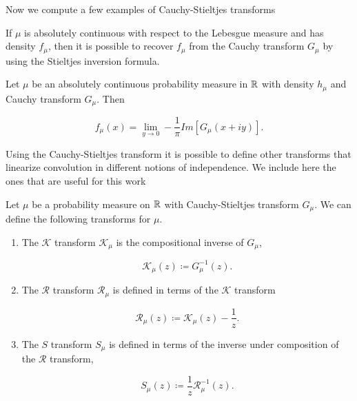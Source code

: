     Now we compute a few examples of Cauchy-Stieltjes transforms

    \begin{example}  
    \end{example}

    If $\mu$ is absolutely continuous with respect to the Lebesgue measure and has density $f_\mu$, then it is possible to recover $f_\mu$ from the Cauchy transform $G_\mu$ by using the Stieltjes inversion formula.

    \begin{theorem}
        Let $\mu$ be an absolutely continuous probability measure in $\mathbb R$ with density $h_\mu$ and Cauchy transform $G_\mu$. Then

        \begin{equation*}
            f_\mu(x) = \lim_{y \to 0} - \frac1\pi Im[G_\mu(x + iy)].
        \end{equation*}
    \end{theorem}

    Using the Cauchy-Stieltjes transform it is possible to define other transforms that linearize convolution in different notions of independence. We include here the ones that are useful for this work

    \begin{definition}
        Let $\mu$ be a probability measure on $\mathbb R$ with Cauchy-Stieltjes transform $G_\mu$. We can define the following transforms for $\mu$.

        \begin{enumerate}
            \item The $\mathcal K$ transform $\mathcal K_\mu$ is the compositional inverse of $G_\mu$,
            
                \[ \mathcal K_\mu (z) \coloneqq G_\mu^{-1}(z). \]

            
            
            \item The $\mathcal R$ transform $\mathcal R_\mu$ is defined in terms of the $\mathcal K$ transform

                \[ \mathcal R_\mu(z) \coloneqq \mathcal K_\mu(z) - \frac1z. \]

            

            \item The $S$ transform $S_\mu$ is defined in terms of the inverse under composition of the $\mathcal R$ transform,
            
            \[ S_\mu(z) \coloneqq \frac1z\mathcal R_{\mu}^{-1}(z).\] 
        \end{enumerate}
    \end{definition}


